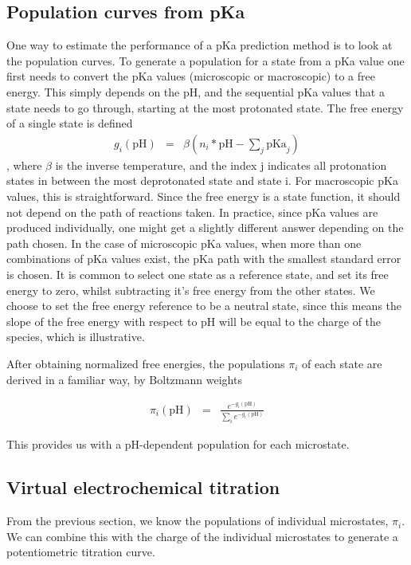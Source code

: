 \documentclass[9pt,lineno,final]{elife}
\newcommand{\pH}{\mathrm{pH}}
\newcommand{\pKa}{\mathrm{pKa}}
\begin{document}
\subsection{Population curves from pKa}
One way to estimate the performance of a pKa prediction method is to look at the population curves.
%
To generate a population for a state from a pKa value one first needs to convert the pKa values (microscopic or macroscopic) to a free energy.
%
This simply depends on the pH, and the sequential pKa values that a state needs to go through, starting at the most protonated state.
%
The free energy of a single state is defined 
\begin{eqnarray}
	g_i(\pH) &=& \beta \left( n_i*\pH - \sum_j \pKa_j \right)
\end{eqnarray}
%
, where $\beta$ is the inverse temperature, and the index j indicates all protonation states in between the most deprotonated state and state i. 
%
For macroscopic pKa values, this is straightforward.
%
Since the free energy is a state function, it should not depend on the path of reactions taken.
%
In practice, since pKa values are produced individually, one might get a slightly different answer depending on the path chosen.
%
In the case of microscopic pKa values, when more than one combinations of pKa values exist, the pKa path with the smallest standard error is chosen.
%
It is common to select one state as a reference state, and set its free energy to zero, whilst subtracting it's free energy from the other states.
%
We choose to set the free energy reference to be a neutral state, since this means the slope of the free energy with respect to pH will be equal to the charge of the species, which is illustrative.

After obtaining normalized free energies, the populations $\pi_i$ of each state are derived in a familiar way, by Boltzmann weights

\begin{eqnarray}
	\pi_i(\pH) &=& \frac{e^{-g_i(\pH)}}{\sum_i e^{-g_i(\pH)} }
\end{eqnarray}

This provides us with a pH-dependent population for each microstate.

\subsection{Virtual electrochemical titration}

From the previous section, we know the populations of individual microstates, $\pi_i$. 
%
We can combine this with the charge of the individual microstates to generate a potentiometric titration curve.
%
\end{document}
